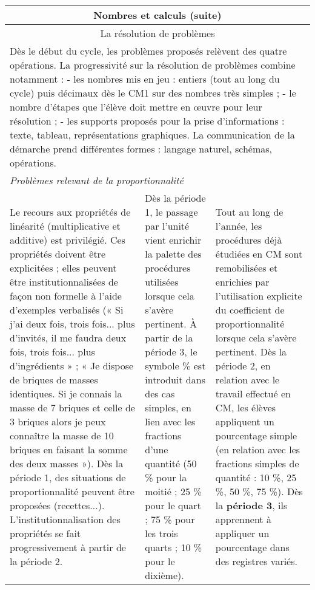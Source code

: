 \documentclass[11pt]{article}
\newcommand{\categorie}[1]{\hline\multicolumn{3}{|c|}{\color{white}\Large\cellcolor{or}\sffamily\phantom{É} #1 \phantom{É}}\rmfamily \\\hline}
\newcommand{\souscategorie}[1]{\hline\multicolumn{3}{|c|}{\color{or}\sffamily\phantom{É}#1\phantom{É}\rmfamily}\\\hline}
\newcommand{\note}[1]{\hline\multicolumn{3}{|p{18.6cm}|}{#1} \\ \hline}
\newenvironment{programme}
{
    \setlength{\arrayrulewidth}{0.5pt}
    \arrayrulecolor{or}
    \begin{center}
    \begin{tabular}{|p{6.4cm}|p{6.4cm}|p{6.4cm}|}
}
{
    \hline
    \end{tabular}
    \end{center}
}
\begin{document}
\begin{programme}
    \categorie{Nombres et calculs (suite)}
    \souscategorie{La résolution de problèmes} 
    \note{Dès le début du cycle, les problèmes proposés relèvent des quatre opérations. La progressivité sur la résolution de problèmes combine notamment : - les nombres mis en jeu : entiers (tout au long du cycle) puis décimaux dès le CM1 sur des nombres très simples ; - le nombre d’étapes que l’élève doit mettre en œuvre pour leur résolution ; - les supports proposés pour la prise d’informations : texte, tableau, représentations graphiques. La communication de la démarche prend différentes formes : langage naturel, schémas, opérations.} 
    \note{\textit{Problèmes relevant de la proportionnalité}} 
    Le recours aux propriétés de linéarité (multiplicative et additive) est privilégié. Ces propriétés doivent être explicitées ; elles peuvent être institutionnalisées de façon non formelle à l’aide d’exemples verbalisés (« Si j’ai deux fois, trois fois... plus d’invités, il me faudra deux fois, trois fois... plus d’ingrédients » ; « Je dispose de briques de masses identiques. Si je connais la masse de 7 briques et celle de 3 briques alors je peux connaître la masse de 10 briques en faisant la somme des deux masses »). Dès la période 1, des situations de proportionnalité peuvent être proposées (recettes...). L'institutionnalisation des propriétés se fait progressivement à partir de la période 2. & Dès la période 1, le passage par l’unité vient enrichir la palette des procédures utilisées lorsque cela s’avère pertinent. À partir de la période 3, le symbole \% est introduit dans des cas simples, en lien avec les fractions d’une quantité (50 \% pour la moitié ; 25 \% pour le quart ; 75 \% pour les trois quarts ; 10 \% pour le dixième). & Tout au long de l’année, les procédures déjà étudiées en CM sont remobilisées et enrichies par l’utilisation explicite du coefficient de proportionnalité lorsque cela s’avère pertinent. Dès la période 2, en relation avec le travail effectué en CM, les élèves appliquent un pourcentage simple (en relation avec les fractions simples de quantité : 10 \%, 25 \%, 50 \%, 75 \%). Dès la \textbf{période 3}, ils apprennent à appliquer un pourcentage dans des registres variés. \\
\end{programme}
\end{document}
